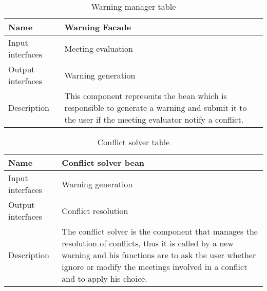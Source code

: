 \begin{flushleft}
	
	\begin{table}[htp]
		
		\begin{tabular}{l|p{7cm}}
		
			Name&\textbf{Warning Facade}\\
			\hline
			\hline
			Input interfaces& Meeting evaluation\\
			\hline
			Output interfaces& Warning generation\\
			\hline
			Description&This component represents the bean which is responsible to generate a warning and submit it to the user if the meeting evaluator notify a conflict. \\
			\hline
				
		\end{tabular}
		
		\caption{Warning manager table } 
		\label{tab:warningmanagertable}
		
	\end{table}
	
\end{flushleft}

\begin{flushleft}
	
	\begin{table}[htp]
		
		\begin{tabular}{l|p{7cm}}
		
			Name&\textbf{Conflict solver bean}\\
			\hline
			\hline
			Input interfaces& Warning generation\\
			\hline
			Output interfaces& Conflict resolution\\
			\hline
			Description&The conflict solver is the component that manages the resolution of conflicts, thus it is called by a new warning and his functions are to ask the user whether ignore or modify the meetings involved in a conflict and to apply his choice. \\
			\hline
			
		\end{tabular}
		
		\caption{Conflict solver table } 
		\label{tab:conflictsolvertable}
		
	\end{table}
	
\end{flushleft}

